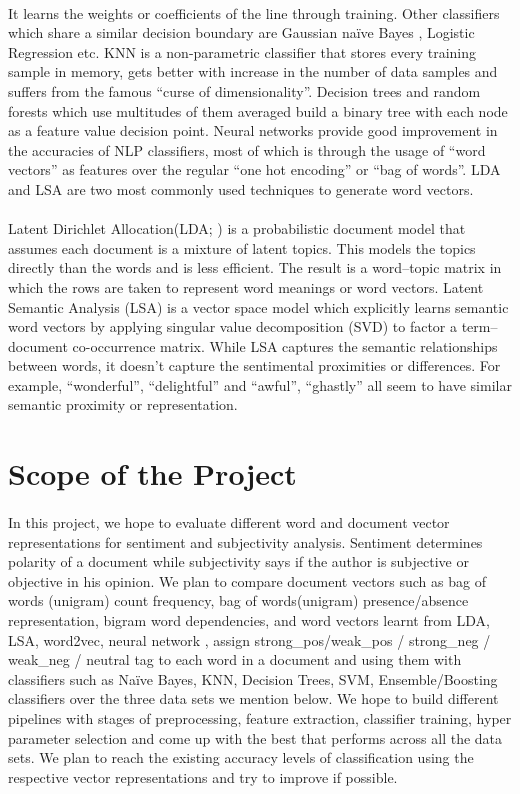\documentclass[11pt, oneside]{article}   	%
\begin{document}
\paragraph{}
It learns the weights or coefficients of the line through training. Other classifiers which share a similar decision boundary are Gaussian naïve Bayes , Logistic Regression etc. KNN is a non-parametric classifier that stores every training sample in memory, gets better with increase in the number of data samples and suffers from the famous “curse of dimensionality”. Decision trees and random forests which use multitudes of them averaged build a binary tree with each node as a feature value decision point.
Neural networks provide good improvement in the accuracies of NLP classifiers, most of which is through the usage of “word vectors” as features over the regular “one hot encoding” or “bag of words”. LDA and LSA are two most commonly used techniques to generate word vectors.
\paragraph{}
Latent Dirichlet Allocation(LDA; \cite{blei2003latent}) is a probabilistic document model that assumes each document is a mixture of latent topics. This models the topics directly than the words and is less efficient. The result is a word–topic matrix in which the rows are taken to represent word meanings or word vectors. Latent Semantic Analysis (LSA) is a vector space model which explicitly learns semantic word vectors by applying singular value decomposition (SVD) to factor a term–document co-occurrence matrix. While LSA captures the semantic relationships between words, it doesn’t capture the sentimental proximities or differences. For example, ``wonderful'', ``delightful'' and ``awful'', ``ghastly'' all seem to have similar semantic proximity or representation.
\section*{Scope of the Project}
\paragraph{}
In this project, we hope to evaluate different word and document vector representations for sentiment and subjectivity analysis. Sentiment determines polarity of a document while subjectivity says if the author is subjective or objective in his opinion. We plan to compare document vectors such as bag of words (unigram) count frequency, bag of words(unigram) presence/absence representation, bigram word dependencies, and word vectors learnt from LDA, LSA, word2vec, neural network , assign strong\_pos/weak\_pos / strong\_neg / weak\_neg / neutral tag to each word in a document and using them with classifiers such as Naïve Bayes, KNN, Decision Trees, SVM, Ensemble/Boosting classifiers over the three data sets we mention below. We hope to build different pipelines with stages of preprocessing, feature extraction, classifier training, hyper parameter selection and come up with the best that performs across all the data sets. We plan to reach the existing accuracy levels of classification using the respective vector representations and try to improve if possible.
\end{document}
